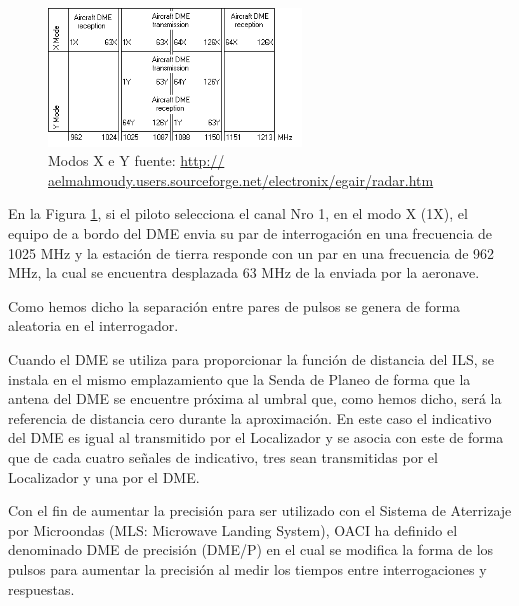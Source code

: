 \begin{figure}[!htb]
  \centering
  \includegraphics[width=0.6\textwidth]{Imagenes/06.04.dme.imagenes/dme-modos.gif}
  \caption{Modos X e Y
{\tiny fuente: \url{http://
aelmahmoudy.users.sourceforge.net/electronix/egair/radar.htm
}}
}
  \label{fig:DME.modos.X.e.Y}
\end{figure}


En la Figura \ref{fig:DME.modos.X.e.Y}, si el piloto selecciona el canal Nro 1, en el modo X (1X), el equipo de a bordo del DME envia su par de interrogaci\'on en una frecuencia de 1025 MHz y la estaci\'on de tierra responde con un par en una frecuencia de 962 MHz, la cual se encuentra desplazada 63 MHz de la enviada por la aeronave.

Como hemos dicho la separaci\'on entre pares de pulsos se genera de forma aleatoria en el interrogador.

Cuando el DME se utiliza para proporcionar la funci\'on de distancia del ILS, se instala en el mismo emplazamiento que la Senda de Planeo de forma que la antena del DME se encuentre pr\'oxima al umbral que, como hemos dicho, ser\'a la referencia de distancia cero durante la aproximaci\'on. En este caso el indicativo del DME es igual al transmitido por el Localizador y se asocia con este de forma que de cada cuatro se\~nales de indicativo, tres sean transmitidas por el Localizador y una por el DME.

Con el fin de aumentar la precisi\'on para ser utilizado con el Sistema de Aterrizaje por Microondas (MLS: Microwave Landing System), OACI ha definido el denominado DME de precisi\'on (DME/P) en el cual se modifica la forma de los pulsos para aumentar la precisi\'on al medir los tiempos entre interrogaciones y respuestas.

